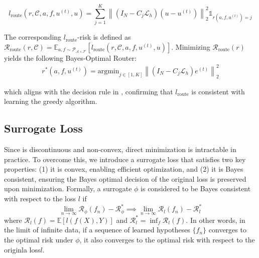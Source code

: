 \documentclass[12pt]{article}
\begin{document}
\begin{equation} \label{eq:routerloss}
    l_{\text{route}}\left(r,\mathcal{C}, a, f, u^{(t)}, u\right) = \sum_{j = 1}^K \left\|\left( I_N - C_{j} \mathcal{L}_{h}\right)\left(u - u^{(t)}\right)\right\|^2_2\mathds{1}_{r(a, f, u^{(t)}) = j}
\end{equation}

The corresponding $l_{\text{route}}$-risk is defined as $\mathcal{R}_{\text{route}}\left(r,\mathcal{C}\right) = \mathbb{E}_{a, f \sim \mathcal{P}_{\mathcal{A} \times \mathcal{F}}}\left[l_{\text{route}}\left(r,\mathcal{C}, a, f, u^{(t)}, u\right)\right]$. Minimizing $\mathcal{R}_{\text{route}}\left(r\right)$ yields the following Bayes-Optimal Router:
\begin{align*}
    r^*(a, f, u^{(t)}) = \text{argmin}_{j \in [1, K]} \left\|\left( I_N - C_{j} \mathcal{L}_{h}\right)e^{(t)}\right\|^2_2
\end{align*}

which aligns with the decision rule in , confirming that $l_{\text{route}}$ is consistent with learning the greedy algorithm.

\subsection{Surrogate Loss}

Since  is discontinuous and non-convex, direct minimization is intractable in practice. To overcome this, we introduce a surrogate loss that satisfies two key properties: (1) it is convex, enabling efficient optimization, and (2) it is Bayes consistent, ensuring the Bayes optimal decision of the original loss is preserved upon minimization. Formally, a surrogate $\phi$ is considered to be Bayes consistent with respect to the loss $l$ if 
\begin{equation*}
    \lim_{n \to \infty} \mathcal{R}_{\phi}(f_n) - \mathcal{R}_{\phi}^* \implies \lim_{n \to \infty} \mathcal{R}_{l}(f_n) - \mathcal{R}_{l}^* 
\end{equation*}
where $\mathcal{R}_{l}(f) = \mathbb{E}\left[l(f(X), Y)\right]$ and $\mathcal{R}_{l}^* = \inf_f\mathcal{R}_{l}(f)$. In other words, in the limit of infinite data, if a sequence of learned hypotheses $\{f_n\}$ converges to the optimal risk under $\phi$, it also converges to the optimal risk with respect to the originla loss$l$.
\end{document}
